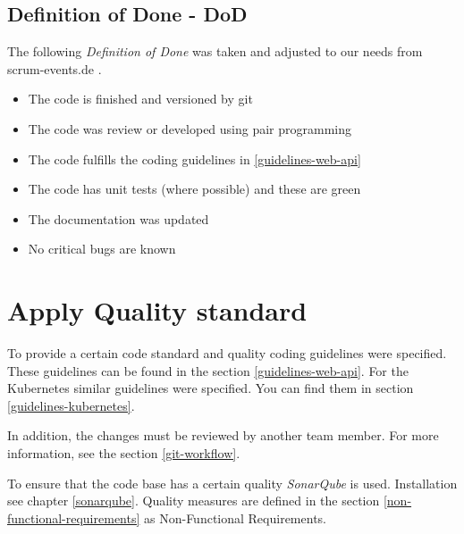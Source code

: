 \subsection{Definition of Done - DoD}
The following \textit{Definition of Done} was taken and adjusted to our needs from scrum-events.de \cite{www.scrum-events.de_dod}.
\begin{itemize}
  \item The code is finished and versioned by git
  \item The code was review or developed using pair programming
  \item The code fulfills the coding guidelines in \ref{guidelines-web-api}
  \item The code has unit tests (where possible) and these are green
  \item The documentation was updated
  \item No critical bugs are known
\end{itemize}

\section{Apply Quality standard}
To provide a certain code standard and quality coding guidelines were specified.
These guidelines can be found in the section \ref{guidelines-web-api}.
For the Kubernetes similar guidelines were specified.
You can find them in section \ref{guidelines-kubernetes}.

In addition, the changes must be reviewed by another team member.
For more information, see the section \ref{git-workflow}.

To ensure that the code base has a certain quality \textit{SonarQube} is used.
Installation see chapter \ref{sonarqube}.
Quality measures are defined in the section \ref{non-functional-requirements} as Non-Functional Requirements.